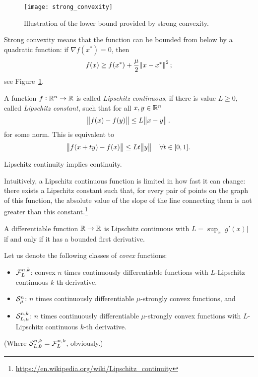 \documentclass{article}
\begin{document}
\begin{figure}[H]
  \centering
  \texttt{[image: strong\_convexity]}
  \caption{Illustration of the lower bound provided by strong
    convexity.\label{fig:strong-convexity}}
\end{figure}

Strong convexity means that the function can be bounded from below by a quadratic function: if
\(\nabla f(x^*) = 0\), then
\begin{equation*}
  f(x) \geq f(x^*) + \frac{\mu}{2} \enVert{x - x^*}^2;
\end{equation*}
see Figure~\ref{fig:strong-convexity}.


\label{s:lipschitz-continuity}

A function \(f: \mathbb{R}^n \to \mathbb{R}\) is called \emph{Lipschitz continuous}, if there is value
\(L \geq 0\), called \emph{Lipschitz constant}, such that for all \(x, y \in \mathbb{R}^n\)
\begin{equation*}
  \enVert{f(x) - f(y)} \leq L \enVert[1]{x - y}.
\end{equation*}
for some norm.  This is equivalent to
\begin{equation*}
  \enVert{f(x + ty) - f(x)} \leq Lt \enVert[1]{y} \quad \forall t \in [0, 1].
\end{equation*}

Lipschitz continuity implies continuity.

Intuitively, a Lipschitz continuous function is limited in how fast it can change: there exists a
Lipschitz constant such that, for every pair of points on the graph of this function, the absolute
value of the slope of the line connecting them is not greater than this
constant.\footnote{\url{https://en.wikipedia.org/wiki/Lipschitz_continuity}}

A differentiable function \(\mathbb{R} \to \mathbb{R}\) is Lipschitz continuous with \(L = \sup_x |g'(x)|\) if
and only if it has a bounded first derivative.

\label{s:lipschitz-strong-convexity}

Let us denote the following classes of \emph{covex} functions:
\begin{itemize}
\item \(\mathcal{F}_{L}^{n, k}\): convex \(n\) times continuously differentiable functions with
  \(L\)-Lipschitz continuous \(k\)-th derivative,
\item \(\mathcal{S}_{\mu}^{n}\): \(n\) times continuously differentiable \(\mu\)-strongly
convex functions, and
\item \(\mathcal{S}_{L, \mu}^{n, k}\): \(n\) times continuously differentiable
  \(\mu\)-strongly convex functions with \(L\)-Lipschitz continuous \(k\)-th derivative.
\end{itemize}
(Where \(\mathcal{S}_{L, 0}^{n, k} = \mathcal{F}_{L}^{n, k}\), obviously.)
\end{document}
